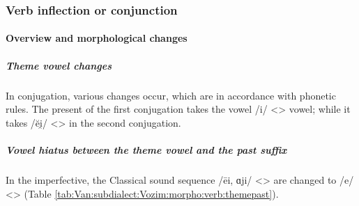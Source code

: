 \subsubsection{Verb inflection or conjunction}

\paragraph{Overview and morphological changes}
\subparagraph{Theme vowel changes}
In conjugation, various changes occur, which are in accordance with phonetic rules. The present of the first conjugation takes the vowel /i/ <> vowel; while it takes /ĕi̯/ <> in the second conjugation. 

\subparagraph{Vowel hiatus between the theme vowel and the past suffix}

In the imperfective, the Classical sound sequence /ēi, ɑji/ <> are changed to /e/ <> (Table \ref{tab:Van:subdialect:Vozim:morpho:verb:themepast}). 

